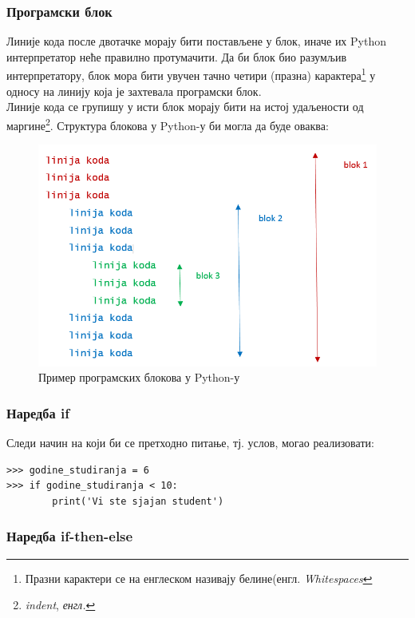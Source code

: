 \documentclass[11pt, serbianc, english, titlepage]{article}
\begin{document}
		\subsubsection{Програмски блок}
		Линије кода после двотачке морају бити постављене у блок, иначе их Python интерпретатор неће правилно протумачити. Да би блок био разумљив интерпретатору, блок мора бити увучен тачно четири (празна) карактера\footnote{Празни карактери се на енглеском називају белине(енгл. \emph{Whitespaces}}  у односу на линију која је захтевала програмски блок\cite{PEP}.\\
		Линије кода се групишу у исти блок морају бити на истој удаљености од маргине\footnote{\emph{indent}, \emph{енгл.}}. Структура блокова у Python-у би могла да буде оваква:\\
		\begin{figure}[here]
		\centering
		\includegraphics[scale=0.5]{whitespace.png}
		\caption{Пример програмских блокова у Python-у}
		\label{slike:whitespace}
		\end{figure}
		
		\subsubsection{Наредба if}
		Следи начин на који би се претходно питање, тј. услов, могао реализовати:
		\begin{lstlisting}[caption = Пример услова, label = if]
>>> godine_studiranja = 6
>>> if godine_studiranja < 10:
        print('Vi ste sjajan student') 
		\end{lstlisting}
		\subsubsection{Наредба if-then-else}
		
\end{document}
